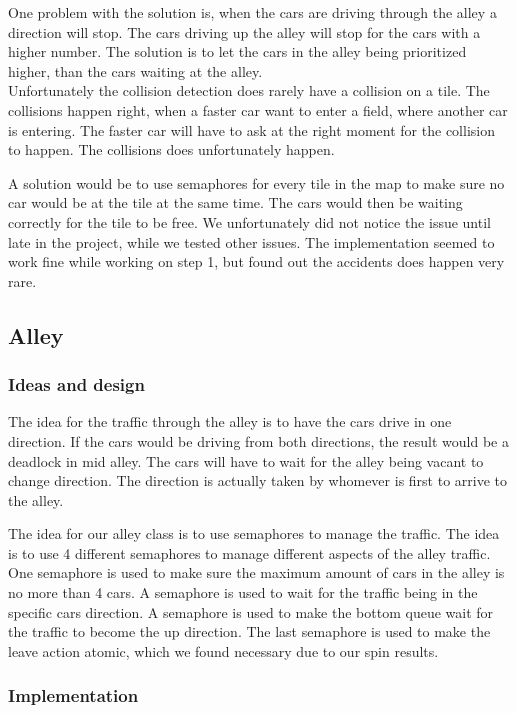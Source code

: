 One problem with the solution is, when the cars are driving through the alley a direction will stop. The cars driving up the alley will stop for the cars with a higher number. The solution is to let the cars in the alley being prioritized higher, than the cars waiting at the alley.
\\

Unfortunately the collision detection does rarely have a collision on a tile. The collisions happen right, when a faster car want to enter a field, where another car is entering. The faster car will have to ask at the right moment for the collision to happen. The collisions does unfortunately happen. 

A solution would be to use semaphores for every tile in the map to make sure no car would be at the tile at the same time. The cars would then be waiting correctly for the tile to be free. We unfortunately did not notice the issue until late in the project, while we tested other issues. The implementation seemed to work fine while working on step 1, but found out the accidents does happen very rare.

\subsection{Alley}
\subsubsection{Ideas and design}
The idea for the traffic through the alley is to have the cars drive in one direction. If the cars would be driving from both directions, the result would be a deadlock in mid alley. The cars will have to wait for the alley being vacant to change direction. The direction is actually taken by whomever is first to arrive to the alley.

The idea for our alley class is to use semaphores to manage the traffic. The idea is to use 4 different semaphores to manage different aspects of the alley traffic. One semaphore is used to make sure the maximum amount of cars in the alley is no more than 4 cars. A semaphore is used to wait for the traffic being in the specific cars direction. A semaphore is used to make the bottom queue wait for the traffic to become the up direction. The last semaphore is used to make the leave action atomic, which we found necessary due to our spin results.

\subsubsection{Implementation}